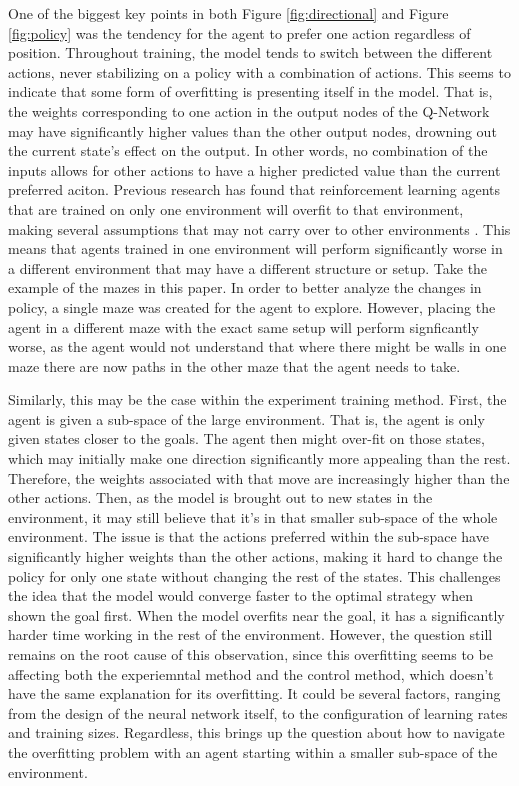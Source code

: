 \documentclass[12pt,letterpaper]{article}
\begin{document}
One of the biggest key points in both Figure \ref{fig:directional} and Figure \ref{fig:policy} was the tendency for the agent to prefer one action regardless of position.
Throughout training, the model tends to switch between the different actions, never stabilizing on a policy with a combination of actions.
This seems to indicate that some form of overfitting is presenting itself in the model.
That is, the weights corresponding to one action in the output nodes of the Q-Network may have significantly higher values than the other output nodes, drowning out the current state's effect on the output.
In other words, no combination of the inputs allows for other actions to have a higher predicted value than the current preferred aciton.
Previous research has found that reinforcement learning agents that are trained on only one environment will overfit to that environment, making several assumptions that may not carry over to other environments \cite{article_overfitting_neural_networks}.
This means that agents trained in one environment will perform significantly worse in a different environment that may have a different structure or setup.
Take the example of the mazes in this paper. In order to better analyze the changes in policy, a single maze was created for the agent to explore.
However, placing the agent in a different maze with the exact same setup will perform signficantly worse, as the agent would not understand that where there might be walls in one maze there are now paths in the other maze that the agent needs to take.

Similarly, this may be the case within the experiment training method.
First, the agent is given a sub-space of the large environment.
That is, the agent is only given states closer to the goals.
The agent then might over-fit on those states, which may initially make one direction significantly more appealing than the rest.
Therefore, the weights associated with that move are increasingly higher than the other actions.
Then, as the model is brought out to new states in the environment, it may still believe that it's in that smaller sub-space of the whole environment.
The issue is that the actions preferred within the sub-space have significantly higher weights than the other actions, making it hard to change the policy for only one state without changing the rest of the states.
This challenges the idea that the model would converge faster to the optimal strategy when shown the goal first.
When the model overfits near the goal, it has a significantly harder time working in the rest of the environment.
However, the question still remains on the root cause of this observation, since this overfitting seems to be affecting both the experiemntal method and the control method, which doesn't have the same explanation for its overfitting.
It could be several factors, ranging from the design of the neural network itself, to the configuration of learning rates and training sizes.
Regardless, this brings up the question about how to navigate the overfitting problem with an agent starting within a smaller sub-space of the environment.
\end{document}

